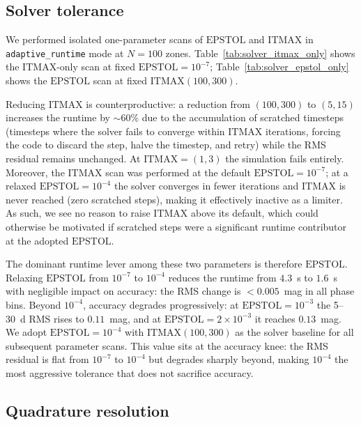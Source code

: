 \documentclass[twocolumn,linenumbers]{aastex701}
\begin{document}
\subsection{Solver tolerance}
\label{sec:solver_sweep}

We performed isolated one-parameter scans of $\mathrm{EPSTOL}$ and $\mathrm{ITMAX}$ in \texttt{adaptive\_\-runtime} mode at $N = 100$ zones. Table~\ref{tab:solver_itmax_only} shows the $\mathrm{ITMAX}$-only scan at fixed $\mathrm{EPSTOL}=10^{-7}$; Table~\ref{tab:solver_epstol_only} shows the $\mathrm{EPSTOL}$ scan at fixed $\mathrm{ITMAX}(100,300)$.

Reducing $\mathrm{ITMAX}$ is counterproductive: a reduction from $(100,300)$ to $(5,15)$ increases the runtime by ${\sim}60\%$ due to the accumulation of scratched timesteps (timesteps where the solver fails to converge within $\mathrm{ITMAX}$ iterations, forcing the code to discard the step, halve the timestep, and retry) while the RMS residual remains unchanged. At $\mathrm{ITMAX}=(1,3)$ the simulation fails entirely. Moreover, the $\mathrm{ITMAX}$ scan was performed at the default $\mathrm{EPSTOL}=10^{-7}$; at a relaxed $\mathrm{EPSTOL}=10^{-4}$ the solver converges in fewer iterations and $\mathrm{ITMAX}$ is never reached (zero scratched steps), making it effectively inactive as a limiter. As such, we see no reason to raise $\mathrm{ITMAX}$ above its default, which could otherwise be motivated if scratched steps were a significant runtime contributor at the adopted $\mathrm{EPSTOL}$.

The dominant runtime lever among these two parameters is therefore $\mathrm{EPSTOL}$. Relaxing $\mathrm{EPSTOL}$ from $10^{-7}$ to $10^{-4}$ reduces the runtime from $4.3$~s to $1.6$~s with negligible impact on accuracy: the RMS change is $<0.005$~mag in all phase bins. Beyond $10^{-4}$, accuracy degrades progressively: at $\mathrm{EPSTOL} = 10^{-3}$ the 5--30~d RMS rises to $0.11$~mag, and at $\mathrm{EPSTOL} = 2 \times 10^{-3}$ it reaches $0.13$~mag. We adopt $\mathrm{EPSTOL}=10^{-4}$ with $\mathrm{ITMAX}(100,300)$ as the solver baseline for all subsequent parameter scans. This value sits at the accuracy knee: the RMS residual is flat from $10^{-7}$ to $10^{-4}$ but degrades sharply beyond, making $10^{-4}$ the most aggressive tolerance that does not sacrifice accuracy.

\subsection{Quadrature resolution}
\label{sec:ni_quad}
\end{document}
